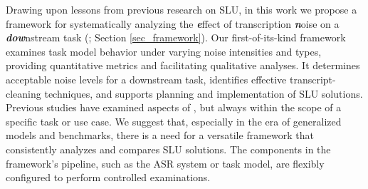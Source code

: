 
Drawing upon lessons from previous research on SLU, in this work we propose a 
framework for systematically analyzing the \textit{\textbf{e}}ffect of transcription \textit{\textbf{n}}oise on a \textit{\textbf{dow}}nstream task (\ENDow; Section \ref{sec_framework}). Our first-of-its-kind framework examines task model behavior under varying noise intensities and types, providing quantitative metrics and facilitating qualitative analyses.
It determines acceptable noise levels for a downstream task, identifies effective transcript-cleaning techniques, and supports planning and implementation of SLU solutions.
Previous studies have examined aspects of \ENDow{}, but always within the scope of a specific task or use case. We suggest that, especially in the era of generalized models and benchmarks, there is a need for a versatile framework that consistently analyzes and compares SLU solutions.
The components in the framework's pipeline, such as the ASR system or task model, are flexibly configured to perform controlled examinations.

